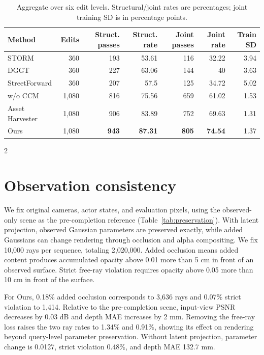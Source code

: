\begin{table}[H]
\centering\small
\setlength{\tabcolsep}{3pt}
\caption{Aggregate over six edit levels. Structural/joint rates are percentages; joint training SD is in percentage points.}
\label{tab:extended-edit-summary}
\begin{tabular}{@{}lrrrrrr@{}}
\toprule
Method & Edits & Struct. passes & Struct. rate & Joint passes & Joint rate & Train SD \\
\midrule
STORM & 360 & 193 & 53.61 & 116 & 32.22 & 3.94 \\
DGGT & 360 & 227 & 63.06 & 144 & 40 & 3.63 \\
StreetForward & 360 & 207 & 57.5 & 125 & 34.72 & 5.02 \\
w/o CCM & 1,080 & 816 & 75.56 & 659 & 61.02 & 1.53 \\
Asset Harvester & 1,080 & 906 & 83.89 & 752 & 69.63 & 1.31 \\
Ours & 1,080 & \textbf{943} & \textbf{87.31} & \textbf{805} & \textbf{74.54} & 1.37 \\
\bottomrule
\end{tabular}
\end{table}
\begin{multicols}{2}

\section{Observation consistency}
\label{sec:supp-preservation}

We fix original cameras, actor states, and evaluation pixels, using the observed-only scene as the pre-completion reference (Table~\ref{tab:preservation}). With latent projection, observed Gaussian parameters are preserved exactly, while added Gaussians can change rendering through occlusion and alpha compositing. We fix 10,000 rays per sequence, totaling 2,020,000. Added occlusion means added content produces accumulated opacity above 0.01 more than 5 cm in front of an observed surface. Strict free-ray violation requires opacity above 0.05 more than 10 cm in front of the surface.

For Ours, 0.18\% added occlusion corresponds to 3,636 rays and 0.07\% strict violation to 1,414. Relative to the pre-completion scene, input-view PSNR decreases by 0.03 dB and depth MAE increases by 2 mm. Removing the free-ray loss raises the two ray rates to 1.34\% and 0.91\%, showing its effect on rendering beyond query-level parameter preservation. Without latent projection, parameter change is 0.0127, strict violation 0.48\%, and depth MAE 132.7 mm.

\end{multicols}
